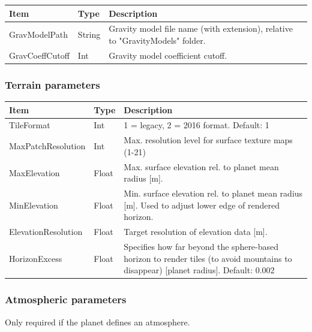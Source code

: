 \documentclass[Orbiter Developer Manual.tex]{subfiles}
\begin{document}
	\begin{longtable}{ |p{}|p{}|p{}| }
	\hline\rule{0pt}{2ex}
	\textbf{Item} & \textbf{Type} & \textbf{Description}\\
	\hline\rule{0pt}{2ex}
	GravModelPath & String & Gravity model file name (with extension), relative to "GravityModels" folder.\\
	\hline\rule{0pt}{2ex}
	GravCoeffCutoff & Int & Gravity model coefficient cutoff.\\
	\hline
	\end{longtable}


\subsubsection*{Terrain parameters}
	\begin{longtable}{ |p{}|p{}|p{}| }
	\hline\rule{0pt}{2ex}
	\textbf{Item} & \textbf{Type} & \textbf{Description}\\
	\hline\rule{0pt}{2ex}
	TileFormat & Int & 1 = legacy, 2 = 2016 format. Default: 1\\
	\hline\rule{0pt}{2ex}
	MaxPatchResolution & Int & Max. resolution level for surface texture maps (1-21)\\
	\hline\rule{0pt}{2ex}
	MaxElevation & Float & Max. surface elevation rel. to planet mean radius [m].\\
	\hline\rule{0pt}{2ex}
	MinElevation & Float & Min. surface elevation rel. to planet mean radius [m]. Used to adjust lower edge of rendered horizon.\\
	\hline\rule{0pt}{2ex}
	ElevationResolution & Float & Target resolution of elevation data [m].\\
	\hline\rule{0pt}{2ex}
	HorizonExcess & Float & Specifies how far beyond the sphere-based horizon to render tiles (to avoid mountains to disappear) [planet radius]. Default: 0.002\\
	\hline
	\end{longtable}


\subsubsection*{Atmospheric parameters}
Only required if the planet defines an atmosphere.
\end{document}
